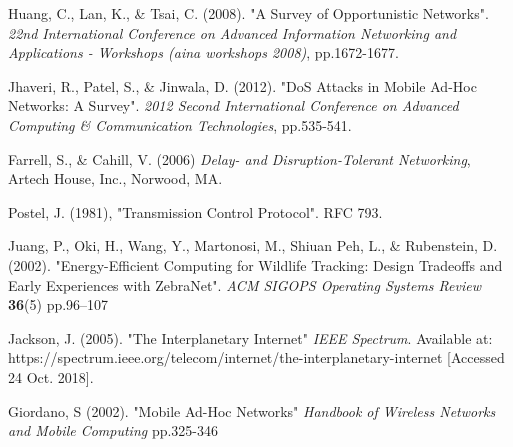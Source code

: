\documentclass{article}
\begin{document}
\begin{thebibliography}{20}

Huang, C., Lan, K., \& Tsai, C. (2008). 
"A Survey of Opportunistic Networks". 
\textit{22nd International Conference on Advanced Information Networking and Applications - Workshops (aina workshops 2008)}, pp.1672-1677.

Jhaveri, R., Patel, S., \& Jinwala, D. (2012).
"DoS Attacks in Mobile Ad-Hoc Networks: A Survey".
\textit{2012 Second International Conference on Advanced Computing \& Communication Technologies}, pp.535-541.

Farrell, S., \& Cahill, V. (2006) \textit{Delay- and Disruption-Tolerant Networking}, Artech House, Inc., Norwood, MA.

Postel, J. (1981), "Transmission Control Protocol". RFC 793.

Juang, P., Oki, H., Wang, Y., Martonosi, M., Shiuan Peh, L., \& Rubenstein, D. (2002).
"Energy-Efficient Computing for Wildlife Tracking: Design Tradeoffs and Early Experiences with ZebraNet".
\textit{ACM SIGOPS Operating Systems Review} \textbf{36}(5) pp.96–107

Jackson, J. (2005). 
"The Interplanetary Internet"
\textit{IEEE Spectrum}. Available at: https://spectrum.ieee.org/telecom/internet/the-interplanetary-internet [Accessed 24 Oct. 2018].

Giordano, S (2002).
"Mobile Ad-Hoc Networks"
\textit{Handbook of Wireless Networks and Mobile Computing} pp.325-346

\end{thebibliography}
 
\end{document}
